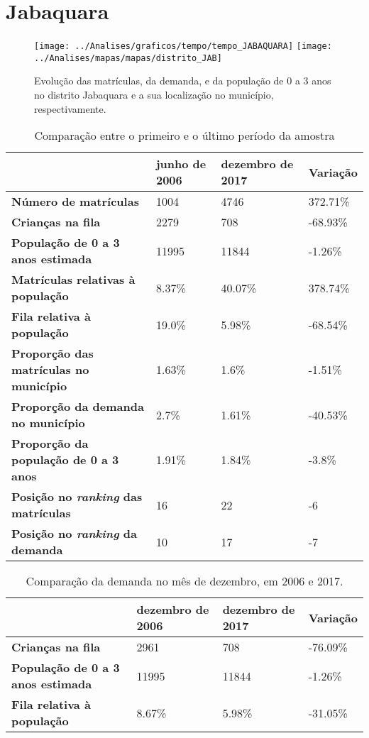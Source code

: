 \section{Jabaquara}
\begin{figure}[H]
\centering
\texttt{[image: ../Analises/graficos/tempo/tempo\_JABAQUARA]}
\texttt{[image: ../Analises/mapas/mapas/distrito\_JAB]}
\caption{Evolução das matrículas, da demanda, e da população de 0 a 3 anos no distrito Jabaquara e a sua localização no município, respectivamente.}
\end{figure}
\begin{table}[H]
\begin{tabular}{l|l|l|l}
\textbf{}                                      & \textbf{junho de 2006}       & \textbf{dezembro de 2017}    & \textbf{Variação} \\ \hline
\textbf{Número de matrículas}                  & 1004 & 4746 & 372.71\% \\ \hline
\textbf{Crianças na fila}                      & 2279 & 708 & -68.93\% \\ \hline
\textbf{População de 0 a 3 anos estimada}      & 11995 & 11844 & -1.26\% \\ \hline
\textbf{Matrículas relativas à população}      & 8.37\% & 40.07\% & 378.74\% \\ \hline
\textbf{Fila relativa à população}             & 19.0\% & 5.98\% & -68.54\% \\ \hline
\textbf{Proporção das matrículas no município} & 1.63\% & 1.6\% & -1.51\% \\ \hline
\textbf{Proporção da demanda no município}     & 2.7\% & 1.61\% & -40.53\% \\ \hline
\textbf{Proporção da população de 0 a 3 anos}  & 1.91\% & 1.84\% & -3.8\% \\ \hline
\textbf{Posição no \textit{ranking} das matrículas}     & 16 & 22 & -6 \\ \hline
\textbf{Posição no \textit{ranking} da demanda}         & 10 & 17 & -7 \\ 
\end{tabular}
\caption{Comparação entre o primeiro e o último período da amostra}
\end{table}
\begin{table}[H]
\begin{tabular}{l|l|l|l}
\textbf{}                                 & \textbf{dezembro de 2006} & \textbf{dezembro de 2017} & \textbf{Variação} \\ \hline
\textbf{Crianças na fila}                      & 2961 & 708 & -76.09\% \\ \hline
\textbf{População de 0 a 3 anos estimada}      & 11995 & 11844 & -1.26\% \\ \hline
\textbf{Fila relativa à população}             & 8.67\% & 5.98\% & -31.05\% \\
\end{tabular}
\caption{Comparação da demanda no mês de dezembro, em 2006 e 2017.}
\end{table}
